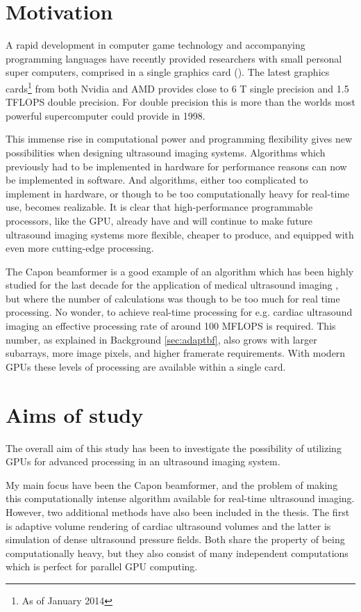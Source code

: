 \section{Motivation}
A rapid development in computer game technology and accompanying programming languages have recently provided researchers with small personal super computers, comprised in a single graphics card (). The latest graphics cards\footnote{As of January 2014} from both Nvidia and AMD provides close to 6 T single precision and 1.5 TFLOPS double precision. For double precision this is more than the worlds most powerful supercomputer could provide in 1998.

This immense rise in computational power and programming flexibility gives new possibilities when designing ultrasound imaging systems. Algorithms which previously had to be implemented in hardware for performance reasons can now be implemented in software. And algorithms, either too complicated to implement in hardware, or though to be too computationally heavy for real-time use, becomes realizable. It is clear that high-performance programmable processors, like the GPU, already have and will continue to make future ultrasound imaging systems more flexible, cheaper to produce, and equipped with even more cutting-edge processing.

The Capon beamformer is a good example of an algorithm which has been highly studied for the last decade for the application of medical ultrasound imaging , but where the number of calculations was though to be too much for real time processing. No wonder, to achieve real-time processing for e.g. cardiac ultrasound imaging an effective processing rate of around 100 MFLOPS is required. This number, as explained in Background \ref{sec:adaptbf}, also grows with larger subarrays, more image pixels, and higher framerate requirements.  With modern GPUs these levels of processing are available within a single card.

\section{Aims of study}
The overall aim of this study has been to investigate the possibility of utilizing GPUs for advanced processing in an ultrasound imaging system. 

My main focus have been the Capon beamformer, and the problem of making this computationally intense algorithm available for real-time ultrasound imaging. However, two additional methods have also been included in the thesis. The first is adaptive volume rendering of cardiac ultrasound volumes and the latter is simulation of dense ultrasound pressure fields. Both share the property of being computationally heavy, but they also consist of many independent computations which is perfect for parallel GPU computing. 

